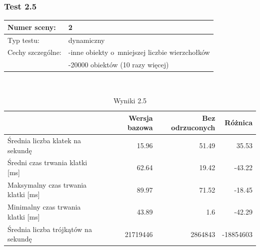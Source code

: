 \documentclass[a4paper,twoside,12pt]{book}
\begin{document}
\subsubsection{Test 2.5}
\begin{tabular}{|l||l|}
\hline
Numer sceny: & 2 \\
\hline
Typ testu: & dynamiczny \\
\hline
Cechy szczególne: & -inne obiekty o~mniejszej liczbie wierzchołków \\
& -20000 obiektów (10 razy więcej) \\
\hline
\end{tabular}\\

\begin{table}[H]
    \centering
    \caption{Wyniki 2.5}
    \label{tab:frustrum_test5}
    \begin{tabular}{|l||r|r|r|}
        \hline
        & Wersja bazowa & Bez odrzuconych & Różnica \\
        \hline
        Średnia liczba klatek na sekundę & 15.96 & 51.49 & 35.53 \\
        \hline
        Średni czas trwania klatki [ms] & 62.64 & 19.42 & -43.22 \\
        \hline
        Maksymalny czas trwania klatki [ms] & 89.97 & 71.52 & -18.45 \\
        \hline
        Minimalny czas trwania klatki [ms] & 43.89 & 1.6 & -42.29 \\
        \hline
        Średnia liczba trójkątów na sekundę & 21719446 & 2864843 & -18854603 \\
        \hline
    \end{tabular}
\end{table}
\end{document}
